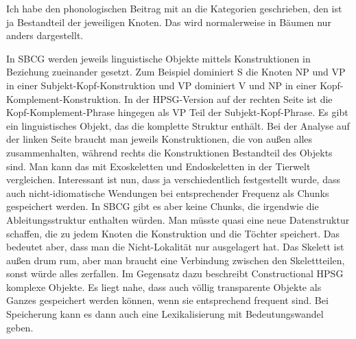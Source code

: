 Ich habe den phonologischen Beitrag mit an die Kategorien geschrieben, den \phon ist ja Bestandteil
der jeweiligen Knoten. Das wird normalerweise in Bäumen nur anders dargestellt. 

In SBCG werden jeweils linguistische Objekte mittels Konstruktionen in Beziehung zueinander
gesetzt. Zum Beispiel dominiert S die Knoten NP und VP in einer Subjekt-Kopf-Konstruktion und VP
dominiert V und NP in einer Kopf-Komplement-Konstruktion. In der HPSG-Version auf der rechten Seite
ist die Kopf-Komplement-Phrase hingegen als VP Teil der Subjekt-Kopf-Phrase. Es gibt ein linguistisches Objekt, das die
komplette Struktur enthält. Bei der Analyse auf der linken Seite braucht man jeweils Konstruktionen,
die von außen alles zusammenhalten, während rechts die Konstruktionen Bestandteil des Objekts
sind. Man kann das mit Exoskeletten und Endoskeletten in der Tierwelt vergleichen. Interessant ist
nun, dass ja verschiedentlich festgestellt wurde, dass auch nicht-idiomatische Wendungen bei
entsprechender Frequenz als Chunks gespeichert werden. In SBCG gibt es aber keine Chunks, die
irgendwie die Ableitungsstruktur enthalten würden. Man müsste quasi eine neue Datenstruktur
schaffen, die zu jedem Knoten die Konstruktion und die Töchter speichert. Das bedeutet aber, dass
man die Nicht-Lokalität nur ausgelagert hat. Das Skelett ist außen drum rum, aber man braucht eine
Verbindung zwischen den Skelettteilen, sonst würde alles zerfallen. Im Gegensatz dazu beschreibt
Constructional HPSG komplexe Objekte. Es liegt nahe, dass auch völlig transparente Objekte als
Ganzes gespeichert werden können, wenn sie entsprechend frequent sind. Bei Speicherung kann es dann
auch eine Lexikalisierung mit Bedeutungswandel geben.

